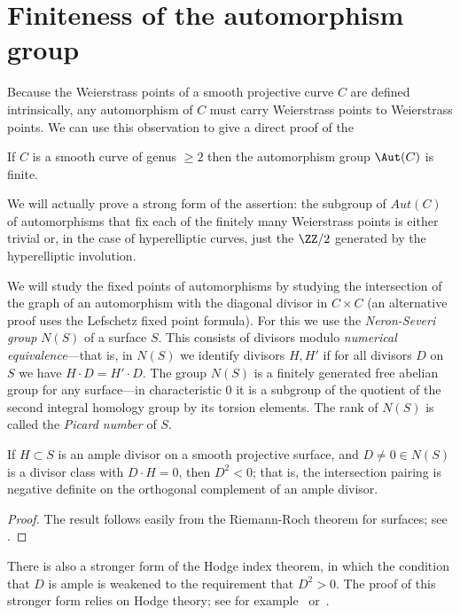 \section{Finiteness of the automorphism group}\label{finiteness section}

Because the Weierstrass points of a smooth projective curve $C$ are defined intrinsically, any automorphism of $C$ must carry Weierstrass points to Weierstrass points. We can use this observation to give a direct proof of the

\begin{theorem}\label{finite autos}
If $C$ is a smooth curve of genus $\geq 2$ then the automorphism group $\Aut(C)$ is finite.
\end{theorem}

We will actually prove a strong form of the assertion: the subgroup of $Aut(C)$ of automorphisms that fix each  of the finitely many Weierstrass points is either
 trivial or, in the case of hyperelliptic curves, just the $\ZZ/2$ generated by the hyperelliptic involution.
    
We will study the fixed points of automorphisms by studying the intersection of the graph of
an automorphism with the diagonal divisor in $C\times C$ (an alternative proof uses the Lefschetz fixed point formula). For this we use the
\emph{Neron-Severi group} $N(S)$ of a surface $S$. This consists of divisors modulo \emph{numerical equivalence}---that is, in $N(S)$ we identify divisors $H, H'$ if for all divisors $D$ on $S$ we have $H\cdot D = H'\cdot D$. The group
$N(S)$ is a  finitely generated free abelian group for any surface---in characteristic 0 it is a subgroup of the quotient of the second integral homology group by its torsion elements. The rank of $N(S)$ is called the \emph{Picard number} of $S$. 

\begin{theorem}\label{hodge index}
If $H\subset S$ is an ample divisor on a smooth projective surface, and $D \neq 0 \in N(S)$ is a divisor class with $D\cdot H = 0$, then 
$D^2<0$; that is, the intersection pairing is negative definite on the orthogonal complement of an
ample divisor.
\end{theorem}
\begin{proof}
The result follows easily from the Riemann-Roch theorem for surfaces; see \cite[Theorem V.1.9]{Hartshorne1977}.  
\end{proof}

There is also a stronger form of the Hodge index theorem, in which the condition that $D$ is ample is weakened to the requirement that $D^2 > 0$. The proof of this stronger form relies on Hodge theory; see for example~\cite{MR1997577} or~\cite{Griffiths-Harris1978}.

